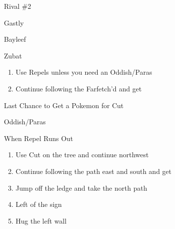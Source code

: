 \begin{paracol}{2}
\begin{boss}{Rival \#2}
	\varwb
	\begin{fightSection}{Gastly}
		\item {} \waterGun{} 
	\end{fightSection}
	\begin{fightSection}{Bayleef}
		\item {} \furyCutter{} 
	\end{fightSection}
	\begin{fightSection}{Zubat}
		\item {} \waterGun{} 
	\end{fightSection}
	\varwe
\end{boss}

\begin{enumerate}[resume]
	\item Use Repels unless you need an Oddish/Paras
	\item Continue following the Farfetch'd and get 
\end{enumerate}

\switchcolumn
\newpage
\begin{encounter}{Last Chance to Get a Pokemon for Cut}
	\varwb
	\begin{fightSection}{Oddish/Paras}
		\item {} \waterGun
		\item \pokeBall{} \encounterHlTwo{(\pointRight)}
	\end{fightSection}
	\varwe
\end{encounter}

\switchcolumn
\begin{menu}{When Repel Runs Out}
	\varwb
	\begin{packMenu}
		\item \repel
		\item \menuHlTwo{(\pointLeft{})}  \cut{}
	\end{packMenu}
	\varwe
\end{menu}

\switchcolumnTwice[*]
\begin{enumerate}[resume]
	\item Use Cut on the tree and continue northwest
	\item Continue following the path east and south and get 
	\item Jump off the ledge and take the north path
	\item Left of the sign \pointRight{} 
	\item Hug the left wall \pointRight{} 
\end{enumerate}


\end{paracol}
